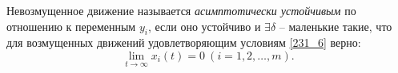 \begin{to_def}
	Невозмущенное движение называется \textit{асимптотически устойчивым} по отношению к переменным $y_i$, если оно устойчиво и $\exists \delta$ -- маленькие такие, что для возмущенных движений удовлетворяющим условиям \eqref{231_6} верно:
	\begin{equation}
		\lim_{t \to \infty} x_i (t) = 0 \ (i = 1, 2, \ldots, m).
		\label{231_8}
	\end{equation}
\end{to_def}
